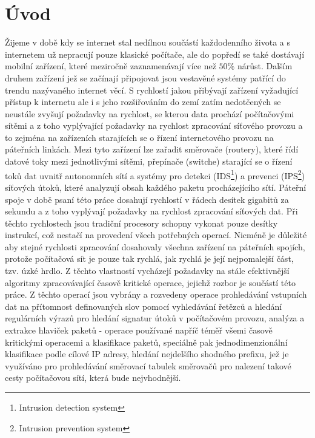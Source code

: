 
\chapter{Úvod} %

Žijeme v době kdy se internet stal nedílnou součástí každodenního života a s internetem už nepracují
pouze klasické počítače, ale do popředí se také dostávají mobilní zařízení, které meziročně
zaznamenávají více než $50\%$ nárůst. Dalším druhem zařízení jež se začínají připojovat
jsou vestavěné systémy patřící do trendu nazývaného internet věcí.
S rychlostí jakou přibývají zařízení vyžadující přístup k internetu ale i s jeho rozšiřováním
do zemí zatím nedotčených se neustále zvyšují požadavky na rychlost, se kterou data prochází počítačovými
sítěmi a z toho vyplývající požadavky na rychlost zpracování síťového provozu a to zejména na zařízeních
starajících se o řízení internetového provozu na páteřních linkách. Mezi tyto
zařízení lze zařadit směrovače (routery), které řídí datové toky mezi jednotlivými sítěmi,
přepínače (switche) starající se o řízení toků dat uvnitř autonomních sítí a
systémy pro detekci (IDS\footnote{Intrusion detection system}) a prevenci (IPS\footnote{Intrusion prevention system})
síťových útoků, které analyzují obsah každého paketu procházejícího sítí.
Páteřní spoje v době psaní této práce dosahují rychlostí v řádech desítek gigabitů
za sekundu a z toho vyplývají požadavky na rychlost zpracování síťových dat. Při těchto rychlostech
jsou tradiční procesory schopny vykonat pouze desítky instrukcí, což nestačí na provedení všech potřebných
operací. Nicméně je důležité aby stejné rychlosti zpracování dosahovaly všechna zařízení na páteřních spojích,
protože počítačová sít je pouze tak rychlá, jak rychlá je její nejpomalejší část, tzv. úzké hrdlo.
Z těchto vlastností vycházejí požadavky na stále efektivnější algoritmy zpracovávající časově kritické operace,
jejichž rozbor je součástí této práce. Z těchto operací jsou vybrány a rozvedeny operace prohledávání vstupních
dat na přítomnost definovaných slov pomocí vyhledávání řetězců a  hledání regulárních výrazů pro hledání signatur
útoků v počítačovém provozu, analýza a extrakce hlaviček paketů - operace používané napříč téměř všemi časově kritickými operacemi a klasifikace paketů, speciálně pak jednodimenzionální klasifikace podle cílové IP adresy,
hledání nejdelšího shodného prefixu, jež je využíváno pro prohledávání směrovací tabulek směrovačů pro
nalezení takové cesty počítačovou sítí, která bude nejvhodnější.

